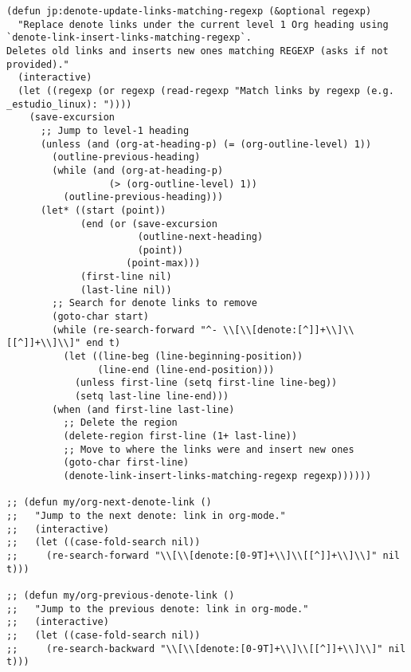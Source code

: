 \documentclass[11pt]{article}
\begin{document}
\begin{verbatim}
(defun jp:denote-update-links-matching-regexp (&optional regexp)
  "Replace denote links under the current level 1 Org heading using `denote-link-insert-links-matching-regexp`.
Deletes old links and inserts new ones matching REGEXP (asks if not provided)."
  (interactive)
  (let ((regexp (or regexp (read-regexp "Match links by regexp (e.g. _estudio_linux): "))))
    (save-excursion
      ;; Jump to level-1 heading
      (unless (and (org-at-heading-p) (= (org-outline-level) 1))
        (outline-previous-heading)
        (while (and (org-at-heading-p)
                  (> (org-outline-level) 1))
          (outline-previous-heading)))
      (let* ((start (point))
             (end (or (save-excursion
                       (outline-next-heading)
                       (point))
                     (point-max)))
             (first-line nil)
             (last-line nil))
        ;; Search for denote links to remove
        (goto-char start)
        (while (re-search-forward "^- \\[\\[denote:[^]]+\\]\\[[^]]+\\]\\]" end t)
          (let ((line-beg (line-beginning-position))
                (line-end (line-end-position)))
            (unless first-line (setq first-line line-beg))
            (setq last-line line-end)))
        (when (and first-line last-line)
          ;; Delete the region
          (delete-region first-line (1+ last-line))
          ;; Move to where the links were and insert new ones
          (goto-char first-line)
          (denote-link-insert-links-matching-regexp regexp))))))

;; (defun my/org-next-denote-link ()
;;   "Jump to the next denote: link in org-mode."
;;   (interactive)
;;   (let ((case-fold-search nil))
;;     (re-search-forward "\\[\\[denote:[0-9T]+\\]\\[[^]]+\\]\\]" nil t)))

;; (defun my/org-previous-denote-link ()
;;   "Jump to the previous denote: link in org-mode."
;;   (interactive)
;;   (let ((case-fold-search nil))
;;     (re-search-backward "\\[\\[denote:[0-9T]+\\]\\[[^]]+\\]\\]" nil t)))


\end{verbatim}
\end{document}
